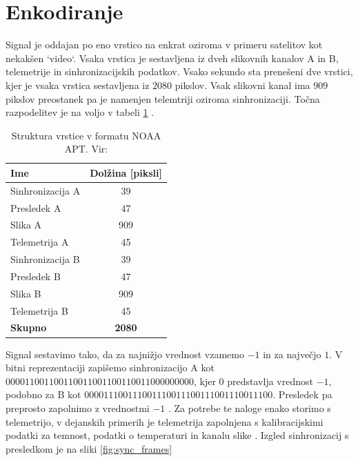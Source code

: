 \documentclass{article}
\begin{document}
\section{Enkodiranje}
Signal je oddajan po eno vrstico na enkrat oziroma v primeru satelitov kot nekakšen `video`. Vsaka vrstica je sestavljena iz dveh slikovnih kanalov A in B, telemetrije in sinhronizacijskih podatkov. Vsako sekundo sta prenešeni dve vrstici, kjer je vsaka vrstica sestavljena iz $2080$ pikslov. Vsak slikovni kanal ima $909$ pikslov preostanek pa je namenjen telemtriji oziroma sinhronizaciji. Točna razpodelitev je na voljo v tabeli \ref{tab:signal_structure} \cite{sigidwiki}.
\begin{table}[H]
\centering
\begin{tabular}{|l|c|}
\hline
\textbf{Ime} & \textbf{Dolžina [piksli]} \\
\hline
Sinhronizacija A      & 39  \\ \hline
Presledek A     & 47  \\ \hline
Slika A     & 909 \\ \hline
Telemetrija A & 45  \\ \hline
Sinhronizacija B      & 39  \\ \hline
Presledek B     & 47  \\ \hline
Slika B     & 909 \\ \hline
Telemetrija B & 45  \\ \hline
\hline
\textbf{Skupno} & \textbf{2080} \\
\hline
\end{tabular}
\caption{Struktura vrstice v formatu NOAA APT. Vir: \cite{sigidwiki}}
\label{tab:signal_structure}
\end{table}
Signal sestavimo tako, da za najnižjo vrednost vzamemo $-1$ in za največjo $1$. V bitni reprezentaciji zapišemo sinhronizacijo A kot $000011001100110011001100110011000000000$, kjer $0$ predstavlja vrednost $-1$, podobno za B kot $000011100111001110011100111001110011100$.  Presledek pa preprosto zapolnimo z vrednostmi $-1$ \cite{sigidwiki}. Za potrebe te naloge enako storimo s telemetrijo, v dejanskih primerih je telemetrija zapolnjena s kalibracijskimi podatki za temnost, podatki o temperaturi in kanalu slike \cite{bernardi}. Izgled sinhronizacij s presledkom je na sliki \ref{fig:sync_frames}
\end{document}
